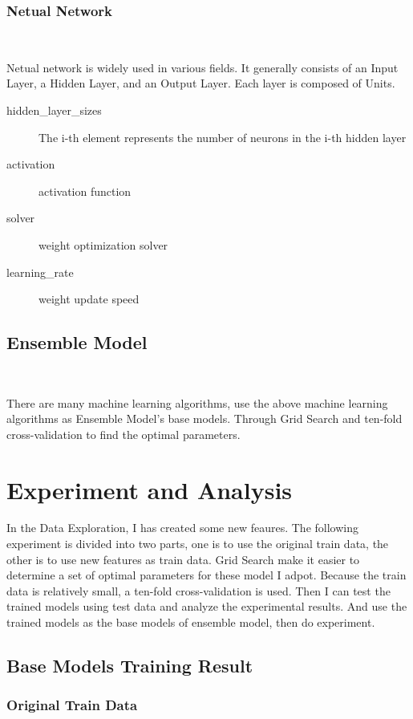 \subsubsection{Netual Network}
\

Netual network is widely used in various fields.
It generally consists of 
an Input Layer, a Hidden Layer, and an Output Layer. 
Each layer is composed of Units. 
	
	
\begin{description}
	\item[hidden_layer_sizes] The i-th element represents 
		the number of neurons in the i-th hidden layer
	\item[activation] activation function
	\item[solver] weight optimization solver
	\item[learning_rate] weight update speed
\end{description}


\subsection{Ensemble Model}
\

There are many machine learning algorithms, 
use the above machine learning algorithms 
as Ensemble Model’s base models. 
Through Grid Search and
ten-fold cross-validation
to find the optimal parameters.

\section{Experiment and Analysis}

In the Data Exploration, 
I has created some new feaures.
The following experiment is divided into two parts,
one is to use the original train data, 
the other is to use new features as train data.
Grid Search make it easier to 
determine a set of optimal parameters
for these model I adpot.
Because the train data is relatively small, 
a ten-fold cross-validation is used. 
Then I can test the trained models 
using test data and 
analyze the experimental results.
And use the trained models as 
the base models of ensemble model,
then do experiment. 

\subsection{Base Models Training Result}
\subsubsection{Original Train Data}
\

